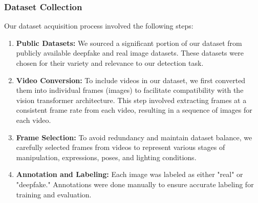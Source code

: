 \subsubsection{Dataset Collection}

\noindent Our dataset acquisition process involved the following steps:

\begin{enumerate}
    \item \textbf{Public Datasets:} We sourced a significant portion of our dataset from publicly available deepfake and real image datasets. These datasets were chosen for their variety and relevance to our detection task.

    \item \textbf{Video Conversion:} To include videos in our dataset, we first converted them into individual frames (images) to facilitate compatibility with the vision transformer architecture. This step involved extracting frames at a consistent frame rate from each video, resulting in a sequence of images for each video.

    \item \textbf{Frame Selection:} To avoid redundancy and maintain dataset balance, we carefully selected frames from videos to represent various stages of manipulation, expressions, poses, and lighting conditions.

    \item \textbf{Annotation and Labeling:} Each image was labeled as either "real" or "deepfake." Annotations were done manually to ensure accurate labeling for training and evaluation.
\end{enumerate}

